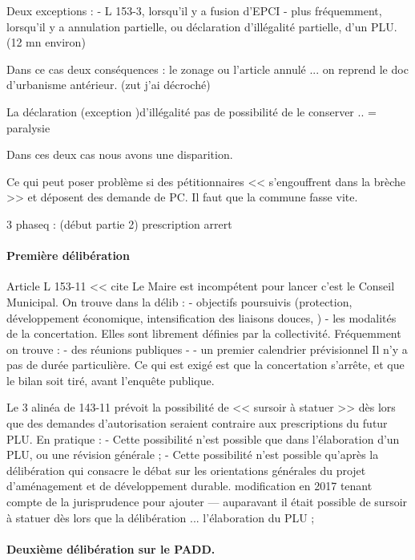 		Deux exceptions :
			- L 153-3, lorsqu'il y a fusion d'EPCI
			- plus fréquemment, lorsqu'il y a annulation partielle, ou déclaration d'illégalité partielle, d'un PLU.
			(12 mn environ) %
			
			Dans ce cas deux conséquences : le zonage ou l'article annulé ... on reprend le doc d'urbanisme antérieur.
			(zut j'ai décroché)
			
			La déclaration (exception )d'illégalité pas de possibilité de le conserver .. = paralysie
			
			Dans ces deux cas nous avons une disparition.
			
			Ce qui peut poser problème si des pétitionnaires << s'engouffrent dans la brèche >> et déposent des demande de PC. Il faut que la commune fasse vite.
			
			3 phaseq :
			(début partie 2)
			prescription
			arrert
		
		\paragraph{Première délibération}
		
		Article L 153-11 << cite 
		Le Maire est incompétent pour lancer c'est le Conseil Municipal. On trouve dans la délib :
		 - objectifs poursuivis (protection, développement économique, intensification des liaisons douces, \etc) 
		 - les modalités de la concertation. Elles sont librement définies par la collectivité. Fréquemment on trouve :
		 	- des réunions publiques
		 	- 
		 	- un premier calendrier prévisionnel
		Il n'y a pas  de durée particulière. Ce qui est exigé est que la concertation s'arrête, et que le bilan soit tiré, avant l'enquête publique.
		
		Le 3\ieme{} alinéa de 143-11 prévoit la possibilité de << sursoir à statuer >> dès lors que des demandes d'autorisation seraient contraire aux prescriptions du futur PLU. En pratique :
			- Cette possibilité n'est possible que dans l'élaboration d'un PLU, ou une révision générale ;
			- Cette possibilité n'est possible qu'après la délibération qui consacre le débat sur les orientations générales du projet d'aménagement et de développement durable. modification en 2017 tenant compte de la jurisprudence pour ajouter --- auparavant il était possible de sursoir à statuer dès lors que la délibération ... l'élaboration du PLU ;
		
		\paragraph{Deuxième délibération sur le PADD.}
		
